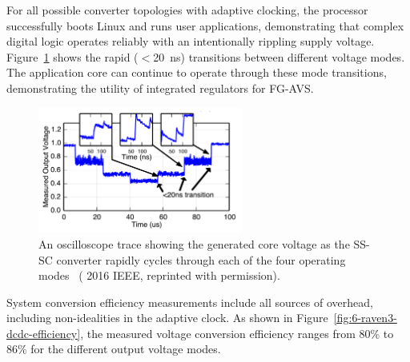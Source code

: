 \documentclass[graybox]{svmult}
\begin{document}
For all possible converter topologies with adaptive clocking, the processor successfully boots Linux and runs user applications, demonstrating that complex digital logic operates reliably with an intentionally rippling supply voltage.
Figure~\ref{fig:6-raven3-dcdc-modes} shows the rapid ($<$\SI{20}{\nano\second}) transitions between different voltage modes.
The application core can continue to operate through these mode transitions, demonstrating the utility of integrated regulators for FG-AVS.

\begin{figure}
  \centering
  \includegraphics[width=0.6\textwidth]{6-raven3-dcdc-modes}
  \caption{An oscilloscope trace showing the generated core voltage as the SS-SC converter rapidly cycles through each of the four operating modes~\cite{Zimmer2016} ({\textcopyright} 2016 IEEE, reprinted with permission).}
  \label{fig:6-raven3-dcdc-modes}
\end{figure}


System conversion efficiency measurements include all sources of overhead, including non-idealities in the adaptive clock.
As shown in Figure~\ref{fig:6-raven3-dcdc-efficiency}, the measured voltage conversion efficiency ranges from 80\% to 86\% for the different output voltage modes.
\end{document}
